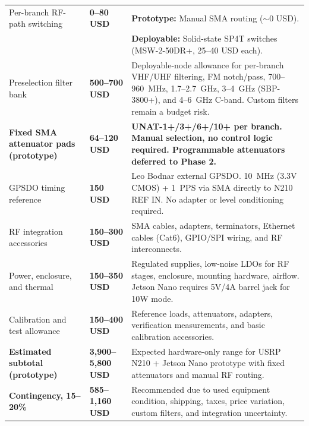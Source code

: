 \documentclass[11pt,a4paper]{article}
\newcommand{\blue}[1]{\textcolor{priceblue}{\textbf{#1}}}
\begin{document}
\begin{table}[htbp]
\begin{tabular}{p{5.4cm}p{2.8cm}p{5.7cm}}
			Per-branch RF-path switching &
			\blue{0--80 USD} &
			\textbf{Prototype:} Manual SMA routing ($\sim$0 USD). \\
			& & \textbf{Deployable:} Solid-state SP4T switches (MSW-2-50DR+, 25--40 USD each). \\
			
			Preselection filter bank &
			\blue{500--700 USD} &
			Deployable-node allowance for per-branch VHF/UHF filtering, FM notch/pass,
			700--960~MHz, 1.7--2.7~GHz, 3--4~GHz (SBP-3800+), and 4--6~GHz C-band.
			Custom filters remain a budget risk. \\
			
			\textbf{Fixed SMA attenuator pads (prototype)} &
			\blue{64--120 USD} &
			\textbf{UNAT-1+/3+/6+/10+ per branch. Manual selection, no control
				logic required. Programmable attenuators deferred to Phase 2.} \\
			
			GPSDO timing reference &
			\blue{150 USD} &
			Leo Bodnar external GPSDO. 10~MHz (3.3V CMOS) + 1~PPS via SMA directly
			to N210 REF IN. No adapter or level conditioning required. \\
			
			RF integration accessories &
			\blue{150--300 USD} &
			SMA cables, adapters, terminators, Ethernet cables (Cat6),
			GPIO/SPI wiring, and RF interconnects. \\
			
			Power, enclosure, and thermal &
			\blue{150--350 USD} &
			Regulated supplies, low-noise LDOs for RF stages, enclosure, mounting
			hardware, airflow. Jetson Nano requires 5V/4A barrel jack for 10W mode. \\
			
			Calibration and test allowance &
			\blue{150--400 USD} &
			Reference loads, attenuators, adapters, verification measurements, and
			basic calibration accessories. \\
			
			\midrule
			
			\textbf{Estimated subtotal (prototype)} &
			\blue{3,900--5,800 USD} &
			Expected hardware-only range for USRP N210 + Jetson Nano prototype with
			fixed attenuators and manual RF routing. \\
			
			\textbf{Contingency, 15--20\%} &
			\blue{585--1,160 USD} &
			Recommended due to used equipment condition, shipping, taxes, price
			variation, custom filters, and integration uncertainty. \\
			

\end{tabular}
\end{table}
\end{document}
